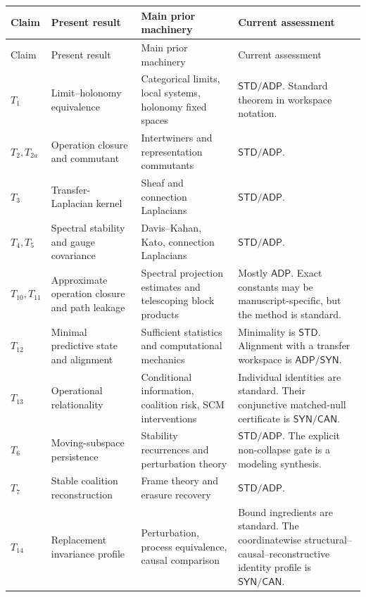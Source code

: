 \documentclass[11pt,letterpaper]{article}
\theoremstyle{plain}
\theoremstyle{definition}
\begin{document}
\small
\begin{longtable}{@{}>{\raggedright\arraybackslash}p{}>{\raggedright\arraybackslash}p{}>{\raggedright\arraybackslash}p{}>{\raggedright\arraybackslash}p{}@{}}
\toprule
Claim & Present result & Main prior machinery & Current assessment \\
\midrule
\endfirsthead
\toprule
Claim & Present result & Main prior machinery & Current assessment \\
\midrule
\endhead
\(T_1\) & Limit--holonomy equivalence & Categorical limits, local systems, holonomy fixed spaces & \(\mathsf{STD}/\mathsf{ADP}\). Standard theorem in workspace notation. \\
\(T_2,T_{2a}\) & Operation closure and commutant & Intertwiners and representation commutants & \(\mathsf{STD}/\mathsf{ADP}\). \\
\(T_3\) & Transfer-Laplacian kernel & Sheaf and connection Laplacians & \(\mathsf{STD}/\mathsf{ADP}\). \\
\(T_4,T_5\) & Spectral stability and gauge covariance & Davis--Kahan, Kato, connection Laplacians & \(\mathsf{STD}/\mathsf{ADP}\). \\
\(T_{10},T_{11}\) & Approximate operation closure and path leakage & Spectral projection estimates and telescoping block products & Mostly \(\mathsf{ADP}\). Exact constants may be manuscript-specific, but the method is standard. \\
\(T_{12}\) & Minimal predictive state and alignment & Sufficient statistics and computational mechanics & Minimality is \(\mathsf{STD}\). Alignment with a transfer workspace is \(\mathsf{ADP}/\mathsf{SYN}\). \\
\(T_{13}\) & Operational relationality & Conditional information, coalition risk, SCM interventions & Individual identities are standard. Their conjunctive matched-null certificate is \(\mathsf{SYN}/\mathsf{CAN}\). \\
\(T_6\) & Moving-subspace persistence & Stability recurrences and perturbation theory & \(\mathsf{STD}/\mathsf{ADP}\). The explicit non-collapse gate is a modeling synthesis. \\
\(T_7\) & Stable coalition reconstruction & Frame theory and erasure recovery & \(\mathsf{STD}/\mathsf{ADP}\). \\
\(T_{14}\) & Replacement invariance profile & Perturbation, process equivalence, causal comparison & Bound ingredients are standard. The coordinatewise structural--causal--reconstructive identity profile is \(\mathsf{SYN}/\mathsf{CAN}\). \\

\end{longtable}
\end{document}
